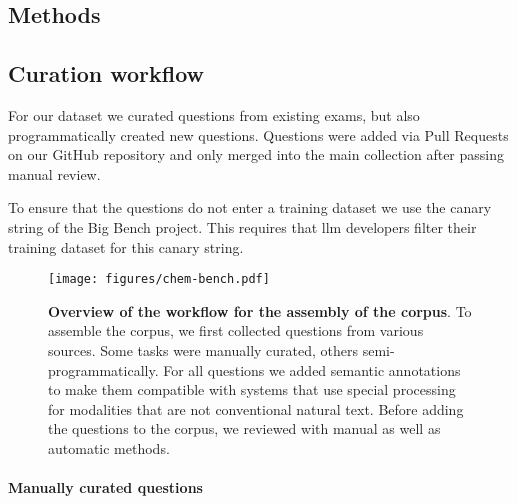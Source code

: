 \documentclass[11pt, oneside]{article}
\begin{document}
\begin{refsection}




\section{Methods}

\subsection{Curation workflow}\label{sec:curation}
For our dataset we curated questions from existing exams, but also programmatically created new questions.
Questions were added via Pull Requests on our GitHub repository and only merged into the main collection after passing manual review.

To ensure that the questions do not enter a training dataset we use the canary string of the Big Bench project.
This requires that \Gls{llm} developers filter their training dataset for this canary string.\autocite{openai2024gpt4, srivastava2022beyond}

\begin{figure}[htb]
    \texttt{[image: figures/chem-bench.pdf]}
    \caption{\textbf{Overview of the workflow for the assembly of the \chembench corpus}. To assemble the \chembench corpus, we first collected questions from various sources. Some tasks were manually curated, others semi-programmatically. For all questions we added semantic annotations to make them compatible with systems that use special processing for modalities that are not conventional natural text. Before adding the questions to the corpus, we reviewed with manual as well as automatic methods.}
    \label{fig:curation_workflow}
\end{figure}

\paragraph{Manually curated questions}


\end{refsection}
\end{document}

